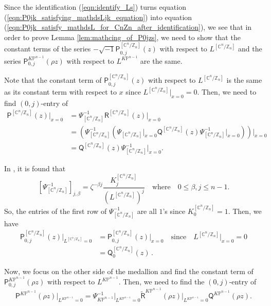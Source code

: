 \documentclass[12pt]{amsart}
\numberwithin{equation}{section}
\newcommand{\CnZn}{[\mathbb{C}^n/\mathbb{Z}_n]}
\newcommand{\KP}{K\mathbb{P}}
\begin{document}
Since the identification (\ref{eqn:identify_Ls}) turns equation (\ref{eqn:P0jk_satisfying_mathdsLjk_equation}) into equation (\ref{eqn:P0jk_satisfy_mathdsL_for_CnZn_after_identification}), we see that in order to prove Lemma \ref{lem:mathcing_of_P0jzs}, we need to show that the constant terms of the series $-\sqrt{-1}\mathsf{P}^{\CnZn}_{0,j}(z)$ with respect to $L^{\CnZn}$ and the series $\mathsf{P}^{\KP^{n-1}}_{0,j}({\rho}z)$ with respect to $L^{\KP^{n-1}}$ are the same.





Note that the constant term of $\mathsf{P}^{\CnZn}_{0,j}(z)$ with respect to $L^{\CnZn}$ is the same as its constant term with respect to $x$ since $L^{\CnZn}\big\vert_{x=0}=0$. Then, we need to find $(0,j)$-entry of
\begin{equation*}
\begin{split}
\mathsf{P}^{\CnZn}(z)\big\vert_{x=0}
&=\Psi^{-1}_{\CnZn}{\mathsf{R}}^{\CnZn}(z)\big\vert_{x=0}\\
&=\left(\Psi^{-1}_{\CnZn}\left(\Psi_{\CnZn}\big\vert_{x=0}\mathsf{Q}^{\CnZn}(z)\Psi^{-1}_{\CnZn}\big\vert_{x=0}\right)\right)\big\vert_{x=0}\\
&=\mathsf{Q}^{\CnZn}(z)\Psi^{-1}_{\CnZn}\big\vert_{x=0}.
\end{split}
\end{equation*}

In \cite{gt}, it is found that
\begin{equation*}
\left[\Psi^{-1}_{\CnZn}\right]_{j,\beta}=\zeta^{-\beta{j}}\frac{K^{\CnZn}_{j}}{(L^{\CnZn})^{j}}\quad\text{where}\quad 0\leq\beta,j\leq n-1.
\end{equation*}
So, the entries of the first row of $\Psi^{-1}_{\CnZn}$ are all $1$'s since $K_0^{\CnZn}=1$. Then, we have
\begin{equation*}
\begin{split}
\mathsf{P}^{\CnZn}_{0,j}(z)\big\vert_{L^{\CnZn}=0}
&=\mathsf{P}^{\CnZn}_{0,j}(z)\big\vert_{x=0}\quad \text{since} \quad L^{\CnZn}\big\vert_{x=0}=0\\
&=\mathsf{Q}_0^{\CnZn}(z)\,.    
\end{split}
\end{equation*}

Now, we focus on the other side of the medallion and find the constant term of $\mathsf{P}^{\KP^{n-1}}_{0,j}({\rho}z)$ with respect to $L^{\KP^{n-1}}$. Then, we need to find the $(0,j)$-entry of 
\begin{equation*}
\mathsf{P}^{\KP^{n-1}}({\rho}z)\big\vert_{L^{\KP^{n-1}}=0}=\Psi^{-1}_{\KP^{n-1}}\big\vert_{L^{\KP^{n-1}}=0}\widetilde{\mathsf{R}}^{\KP^{n-1}}({\rho}z)\big\vert_{L^{\KP^{n-1}}=0}\mathsf{Q}^{\KP^{n-1}}({\rho}z).
\end{equation*}
\end{document}
